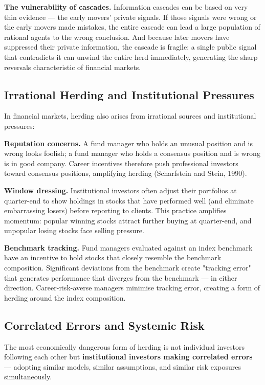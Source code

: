 \documentclass[12pt, letterpaper]{article}
\begin{document}
\textbf{The vulnerability of cascades.} Information cascades can be based on very thin evidence --- the early movers' private signals. If those signals were wrong or the early movers made mistakes, the entire cascade can lead a large population of rational agents to the wrong conclusion. And because later movers have suppressed their private information, the cascade is fragile: a single public signal that contradicts it can unwind the entire herd immediately, generating the sharp reversals characteristic of financial markets.


\subsection{Irrational Herding and Institutional Pressures}


In financial markets, herding also arises from irrational sources and institutional pressures:

\textbf{Reputation concerns.} A fund manager who holds an unusual position and is wrong looks foolish; a fund manager who holds a consensus position and is wrong is in good company. Career incentives therefore push professional investors toward consensus positions, amplifying herding (Scharfstein and Stein, 1990).

\textbf{Window dressing.} Institutional investors often adjust their portfolios at quarter-end to show holdings in stocks that have performed well (and eliminate embarrassing losers) before reporting to clients. This practice amplifies momentum: popular winning stocks attract further buying at quarter-end, and unpopular losing stocks face selling pressure.

\textbf{Benchmark tracking.} Fund managers evaluated against an index benchmark have an incentive to hold stocks that closely resemble the benchmark composition. Significant deviations from the benchmark create "tracking error" that generates performance that diverges from the benchmark --- in either direction. Career-risk-averse managers minimise tracking error, creating a form of herding around the index composition.


\subsection{Correlated Errors and Systemic Risk}


The most economically dangerous form of herding is not individual investors following each other but \textbf{institutional investors making correlated errors} --- adopting similar models, similar assumptions, and similar risk exposures simultaneously.
\end{document}
